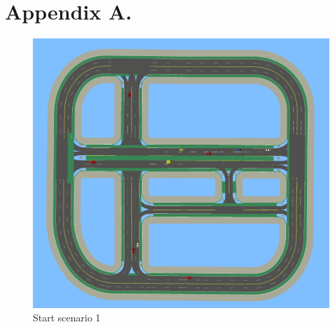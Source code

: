 \chapter{Appendix A.}


\begin{figure}[H] 
	\label{figure:appednix:start_scenario_1}
	\includegraphics[width=1\linewidth]{figures/start_scenario_1}
	\caption{Start scenario 1}
\end{figure}